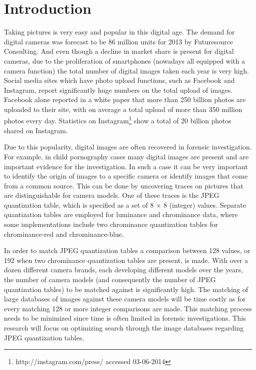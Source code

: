 \documentclass[a4paper,8pt]{article}
\begin{document}
\maketitle
\vspace{-2em}
\section*{Introduction}
Taking pictures is very easy and popular in this digital age. The demand for digital cameras was forecast to be 86 million units for 2013 by Futuresource Consulting\cite{futuresource}. And even though a decline in market share is present for digital cameras, due to the  proliferation of smartphones (nowadays all equipped with a camera function) the total number of digital images taken each year is very high. Social media sites which have photo upload functions, such as Facebook and Instagram, report significantly huge numbers on the total upload of images. Facebook alone reported in a white paper \cite{whitefacebook} that more than 250 billion photos are uploaded to their site, with on average a total upload of more than 350 million photos every day. Statistics on Instagram\footnote{http://instagram.com/press/ accessed 03-06-2014} show a total of 20 billion photos shared on Instagram.

Due to this popularity, digital images are often recovered in forensic investigation. For example, in child pornography cases many digital images are present and are important evidence for the investigation. In such a case it can be very important to identify the origin of images to a specific camera or identify images that come from a common source. This can be done by uncovering traces on pictures that are distinguishable for camera models. One of these traces is the JPEG quantization table, which is specified as a set of 8 $\times$ 8 (integer) values. Separate quantization tables are employed for luminance and chrominance data, where some implementations include two chrominance quantization tables for chrominance-red and chrominance-blue. 

In order to match JPEG quantization tables a comparison between 128 values, or 192 when two chrominance quantization tables are present, is made. With over a dozen different camera brands, each developing different models over the years, the number of camera models (and consequently the number of JPEG quantization tables) to be matched against is significantly high. The matching of large databases of images against these camera models will be time costly as for every matching 128 or more integer comparisons are made. This matching process needs to be minimized since time is often limited in forensic investigations. This research will focus on optimizing search through the image databases regarding JPEG quantization tables.
\end{document}

